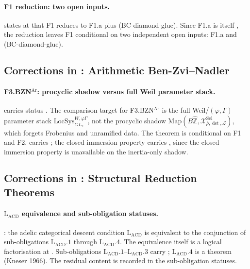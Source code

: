 \paragraph{F1 reduction: two open inputs.}
 states at
\ClaimStatusNeedsVerification that F1 reduces to F1.a
plus (BC-diamond-glue). Since F1.a is itself
\ClaimStatusNeedsVerification, the reduction leaves F1 conditional
on two independent open inputs: F1.a and (BC-diamond-glue).

\subsection{Corrections in : Arithmetic Ben-Zvi--Nadler}
\label{v4-arith:w3-audit-A:ch28}

\paragraph{F3.BZN\({}^{\mathrm{Ar}}\): procyclic shadow versus full Weil parameter stack.}
 carries status \ClaimStatusConjectured.
The comparison target for F3.BZN\({}^{\mathrm{Ar}}\) is the full
Weil/\((\varphi,\Gamma)\) parameter stack
\(\mathrm{LocSys}^{W,\varphi\Gamma}_{GL_{2}}\), not the procyclic
shadow
\(\mathrm{Map}(B\widehat{\mathbb{Z}},\mathcal{X}^{\mathrm{Sel}}_{\bar\rho,\det,\mathcal{L}})\),
which forgets Frobenius and unramified data. The theorem is
conditional on F1 and F2. 
carries \ClaimStatusNeedsVerification; the closed-immersion
property  carries
\ClaimStatusConjectured, since the closed-immersion property is
unavailable on the inertia-only shadow.

\subsection{Corrections in : Structural Reduction Theorems}
\label{v4-arith:w3-audit-A:ch30}

\paragraph{\(\mathrm{L}_{\mathrm{ACD}}\) equivalence and sub-obligation statuses.}
 \ClaimStatusProvedHere: the
adelic categorical descent condition \(\mathrm{L}_{\mathrm{ACD}}\) is
equivalent to the conjunction of sub-obligations
\(\mathrm{L}_{\mathrm{ACD}}.1\) through \(\mathrm{L}_{\mathrm{ACD}}.4\).
The equivalence itself is a logical factorisation at
\ClaimStatusProvedHere. Sub-obligations
\(\mathrm{L}_{\mathrm{ACD}}.1\)--\(\mathrm{L}_{\mathrm{ACD}}.3\) carry
\ClaimStatusConjectured; \(\mathrm{L}_{\mathrm{ACD}}.4\) is a theorem
(Kneser 1966). The residual content is recorded in the
sub-obligation statuses.

